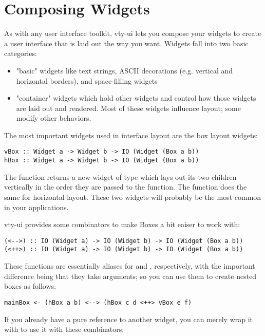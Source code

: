 \section{Composing Widgets}

As with any user interface toolkit, vty-ui lets you compose your widgets
to create a user interface that is laid out the way you want.  Widgets
fall into two basic categories:

\begin{itemize}
\item "basic" widgets like text strings, ASCII decorations
      (e.g. vertical and horizontal borders), and space-filling
      widgets
\item "container" widgets which hold other widgets and control how
      those widgets are laid out and rendered.  Most of these widgets
      influence layout; some modify other behaviors.
\end{itemize}

The most important widgets used in interface layout are the box layout
widgets:

\begin{verbatim}
vBox :: Widget a -> Widget b -> IO (Widget (Box a b))
hBox :: Widget a -> Widget b -> IO (Widget (Box a b))
\end{verbatim}

The  function returns a new widget of type  which lays out its two children vertically in the order they are
passed to the function.  The  function does the same for
horizontal layout.  These two widgets will probably be the most common
in your applications.

vty-ui provides some combinators to make Boxes a bit eaiser to work
with:

\begin{verbatim}
(<-->) :: IO (Widget a) -> IO (Widget b) -> IO (Widget (Box a b))
(<++>) :: IO (Widget a) -> IO (Widget b) -> IO (Widget (Box a b))
\end{verbatim}

These functions are essentially aliases for  and ,
respectively, with the important difference being that they take
 arguments; so you can use them to create nested boxes as
follows:

\begin{verbatim}
mainBox <- (hBox a b) <--> (hBox c d <++> vBox e f)
\end{verbatim}

If you already have a pure reference to another widget, you can merely
wrap it with  to use it with these combinators:

